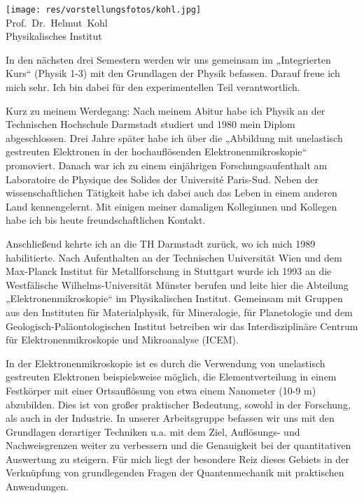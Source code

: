 \begin{multicols}{2}
\begin{center}
	\texttt{[image: res/vorstellungsfotos/kohl.jpg]}\\
\smallskip
	Prof.\ Dr.\ Helmut\ Kohl\\
	Physikalisches Institut
\end{center}

In den nächsten drei Semestern werden wir uns gemeinsam im „Integrierten Kurs“ (Physik 1-3) mit den Grundlagen der Physik befassen. Darauf freue ich mich sehr. Ich bin dabei für den experimentellen Teil verantwortlich.

Kurz zu meinem Werdegang: Nach meinem Abitur habe ich Physik an der Technischen Hochschule Darmstadt studiert und 1980 mein Diplom abgeschlossen. Drei Jahre später habe ich über die „Abbildung mit unelastisch gestreuten Elektronen in der hochauflösenden Elektronenmikroskopie“ promoviert. Danach war ich zu einem einjährigen Forschungsaufenthalt am Laboratoire de Physique des Solides der Université Paris-Sud. Neben der wissenschaftlichen Tätigkeit habe ich dabei auch das Leben in einem anderen Land kennengelernt. Mit einigen meiner damaligen Kolleginnen und Kollegen habe ich bis heute freundschaftlichen Kontakt.

Anschließend kehrte ich an die TH Darmstadt zurück, wo ich mich 1989 habilitierte. Nach Aufenthalten an der Technischen Universität Wien und dem Max-Planck Institut für Metallforschung in Stuttgart wurde ich 1993 an die Westfälische Wilhelms-Universität Münster berufen und leite hier die Abteilung „Elektronenmikroskopie“ im Physikalischen Institut.  Gemeinsam mit Gruppen aus den Instituten für Materialphysik, für Mineralogie, für Planetologie und dem Geologisch-Paläontologischen Institut betreiben wir das Interdisziplinäre Centrum für Elektronenmikroskopie und Mikroanalyse (ICEM).

In der Elektronenmikroskopie ist es durch die Verwendung von unelastisch gestreuten Elektronen beispielsweise möglich, die Elementverteilung in einem Festkörper mit einer Ortsauflösung von etwa einem Nanometer (10-9 m) abzubilden. Dies ist von großer praktischer Bedeutung, sowohl in der Forschung, als auch in der Industrie. In unserer Arbeitsgruppe befassen wir uns mit den Grundlagen derartiger Techniken u.a. mit dem Ziel, Auflösungs- und Nachweisgrenzen weiter  zu verbessern und die Genauigkeit bei der quantitativen Auswertung zu steigern. Für mich liegt der besondere Reiz dieses Gebiets in der Verknüpfung von grundlegenden Fragen der Quantenmechanik mit praktischen Anwendungen.


\end{multicols}
